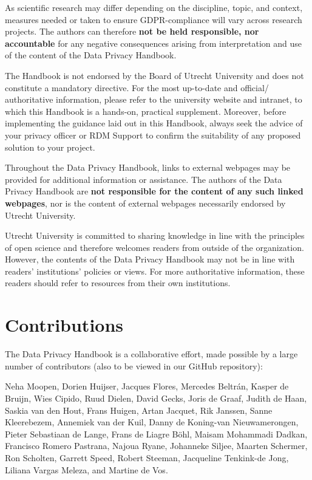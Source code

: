 \documentclass[
]{book}
\begin{document}
As scientific research may differ depending on the discipline, topic, and
context, measures needed or taken to ensure GDPR-compliance will vary across
research projects. The authors can therefore \textbf{not be held responsible, nor
accountable} for any negative consequences arising from interpretation and use
of the content of the Data Privacy Handbook.

The Handbook is not endorsed by the Board of Utrecht University and does not
constitute a mandatory directive. For the most up-to-date and official/
authoritative information, please refer to the
university
website and intranet,
to which this Handbook is a hands-on, practical supplement. Moreover, before
implementing the guidance laid out in this Handbook, always seek the advice of
your privacy officer or RDM Support to confirm the suitability of any proposed
solution to your project.

Throughout the Data Privacy Handbook, links to external webpages may be provided
for additional information or assistance. The authors of the Data Privacy
Handbook are \textbf{not responsible for the content of any such linked webpages}, nor
is the content of external webpages necessarily endorsed by Utrecht University.

Utrecht University is committed to sharing knowledge in line with the principles
of open science and therefore welcomes readers from outside of the organization.
However, the contents of the Data Privacy Handbook may not be in line with readers'
institutions' policies or views. For more authoritative information, these
readers should refer to resources from their own institutions.

\hypertarget{contributions}{%
\section{Contributions}\label{contributions}}

The Data Privacy Handbook is a collaborative effort, made possible by a large
number of contributors (also to be viewed in our
GitHub repository):

Neha Moopen, Dorien Huijser, Jacques Flores, Mercedes Beltrán, Kasper de Bruijn,
Wies Cipido, Ruud Dielen, David Gecks, Joris de Graaf, Judith de Haan,
Saskia van den Hout, Frans Huigen, Artan Jacquet, Rik Janssen, Sanne Kleerebezem,
Annemiek van der Kuil, Danny de Koning-van Nieuwamerongen,
Pieter Sebastiaan de Lange, Frans de Liagre Böhl, Maisam Mohammadi Dadkan,
Francisco Romero Pastrana, Najoua Ryane, Johanneke Siljee, Maarten Schermer,
Ron Scholten, Garrett Speed, Robert Steeman, Jacqueline Tenkink-de Jong,
Liliana Vargas Meleza, and Martine de Vos.
\end{document}
